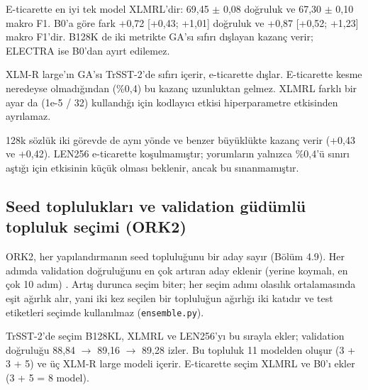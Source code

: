 \documentclass[11pt]{article}
\begin{document}
E-ticarette en iyi tek model XLMRL'dir: 69,45 $\pm$ 0,08 doğruluk ve 67,30 $\pm$ 0,10 makro F1. B0'a göre fark +0,72 [+0,43; +1,01] doğruluk ve +0,87 [+0,52; +1,23] makro F1'dir. B128K de iki metrikte GA'sı sıfırı dışlayan kazanç verir; ELECTRA ise B0'dan ayırt edilemez.

XLM-R large'ın GA'sı TrSST-2'de sıfırı içerir, e-ticarette dışlar. E-ticarette kesme neredeyse olmadığından (\%0,4) bu kazanç uzunluktan gelmez. XLMRL farklı bir ayar da (1e-5 / 32) kullandığı için kodlayıcı etkisi hiperparametre etkisinden ayrılamaz.

128k sözlük iki görevde de aynı yönde ve benzer büyüklükte kazanç verir (+0,43 ve +0,42). LEN256 e-ticarette koşulmamıştır; yorumların yalnızca \%0,4'ü sınırı aştığı için etkisinin küçük olması beklenir, ancak bu sınanmamıştır.

\subsection{Seed toplulukları ve validation güdümlü topluluk seçimi (ORK2)}

ORK2, her yapılandırmanın seed topluluğunu bir aday sayır (Bölüm 4.9). Her adımda validation doğruluğunu en çok artıran aday eklenir (yerine koymalı, en çok 10 adım) \citep{caruana2004}. Artış durunca seçim biter; her seçim adımı olasılık ortalamasında eşit ağırlık alır, yani iki kez seçilen bir topluluğun ağırlığı iki katıdır ve test etiketleri seçimde kullanılmaz (\texttt{ensemble.\allowbreak{}\allowbreak{}py}).

TrSST-2'de seçim B128KL, XLMRL ve LEN256'yı bu sırayla ekler; validation doğruluğu 88,84 $\rightarrow$ 89,16 $\rightarrow$ 89,28 izler. Bu topluluk 11 modelden oluşur (3 + 3 + 5) ve üç XLM-R large modeli içerir. E-ticarette seçim XLMRL ve B0'ı ekler (3 + 5 = 8 model).
\end{document}

